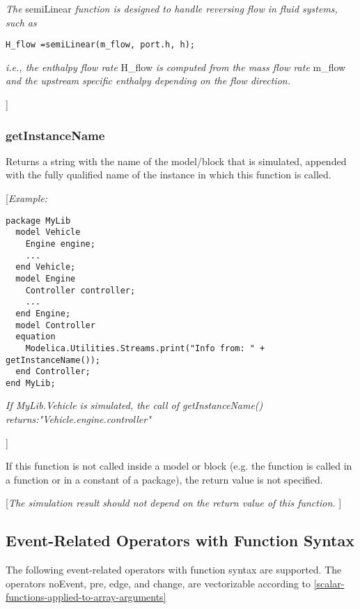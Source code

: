 \emph{The} semiLinear \emph{function is designed to handle reversing
flow in fluid systems, such as}
\begin{lstlisting}[language=modelica]
H_flow =semiLinear(m_flow, port.h, h);
\end{lstlisting}

\emph{i.e., the enthalpy flow rate} H\_flow \emph{is computed from the
mass flow rate} m\_flow \emph{and the upstream specific enthalpy
depending on the flow direction. }

{]}

\subsubsection{getInstanceName}

Returns a string with the name of the model/block that is simulated,
appended with the fully qualified name of the instance in which this
function is called.

{[}\emph{Example:}
\begin{lstlisting}[language=modelica]
package MyLib
  model Vehicle
    Engine engine;
    ...
  end Vehicle;
  model Engine
    Controller controller;
    ...
  end Engine;
  model Controller
  equation
    Modelica.Utilities.Streams.print("Info from: " + getInstanceName());
  end Controller;
end MyLib;
\end{lstlisting}

\emph{If MyLib.Vehicle is simulated, the call of getInstanceName()
returns:"Vehicle.engine.controller"}

{]}

If this function is not called inside a model or block (e.g. the
function is called in a function or in a constant of a package), the
return value is not specified.

{[}\emph{The simulation result should not depend on the return value of
this function.} {]}

\subsection{Event-Related Operators with Function Syntax}

The following event-related operators with function syntax are
supported. The operators noEvent, pre, edge, and change, are
vectorizable according to \autoref{scalar-functions-applied-to-array-arguments}

